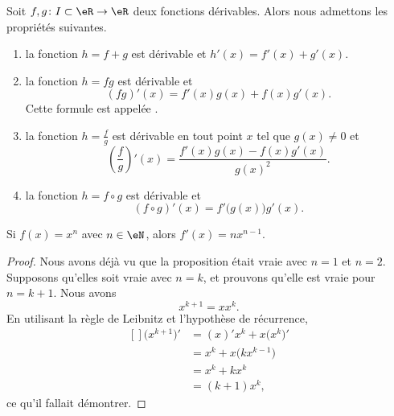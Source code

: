Soit $f,g\colon I\subset\eR\to\eR $ deux fonctions dérivables. Alors nous admettons les propriétés suivantes.
\begin{enumerate}
	\item
		la fonction $h=f+g$ est dérivable et $h'(x)=f'(x)+g'(x)$.
	\item
		la fonction $h=fg$ est dérivable et 
		\begin{equation}
			(fg)'(x)=f'(x)g(x)+f(x)g'(x).
		\end{equation}
		Cette formule est appelée .
	\item
		la fonction $h=\frac{ f }{ g }$ est dérivable en tout point $x$ tel que $g(x)\neq 0$ et 
		\begin{equation}
			\left( \frac{ f }{ g } \right)'(x)=\frac{ f'(x)g(x)-f(x)g'(x) }{ g(x)^2 }.
		\end{equation}
	\item
		la fonction $h=f\circ g$ est dérivable et 
		\begin{equation}
			(f\circ g)'(x)=f'\big( g(x) \big)g'(x).
		\end{equation}
		
\end{enumerate}

\begin{proposition}
	Si $f(x)=x^n$ avec $n\in\eN$, alors $f'(x)=nx^{n-1}$.
\end{proposition}
\begin{proof}
	Nous avons déjà vu que la proposition était vraie avec $n=1$ et $n=2$. Supposons qu'elles soit vraie avec $n=k$, et prouvons qu'elle est vraie pour $n=k+1$. Nous avons
	\begin{equation}
		x^{k+1}=xx^k.
	\end{equation}
	En utilisant la règle de Leibnitz et l'hypothèse de récurrence,
	\begin{equation}
		\begin{aligned}[]
			\big( x^{k+1} \big)'&=(x)'x^k+x\big( x^k \big)'\\
			&=x^k+x\big( kx^{k-1} \big)\\
			&=x^k+kx^k\\
			&=(k+1)x^k,
		\end{aligned}
	\end{equation}
	ce qu'il fallait démontrer.
\end{proof}

